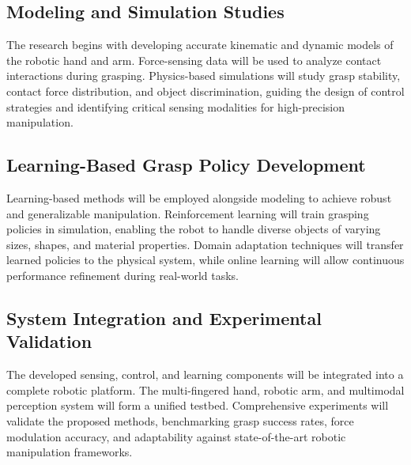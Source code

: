 \documentclass[11pt,a4paper]{article}
\begin{document}
\subsection{Modeling and Simulation Studies}
The research begins with developing accurate kinematic and dynamic models of the robotic hand and arm. Force-sensing data will be used to analyze contact interactions during grasping. Physics-based simulations will study grasp stability, contact force distribution, and object discrimination, guiding the design of control strategies and identifying critical sensing modalities for high-precision manipulation.

\subsection{Learning-Based Grasp Policy Development}
Learning-based methods will be employed alongside modeling to achieve robust and generalizable manipulation. Reinforcement learning will train grasping policies in simulation, enabling the robot to handle diverse objects of varying sizes, shapes, and material properties. Domain adaptation techniques will transfer learned policies to the physical system, while online learning will allow continuous performance refinement during real-world tasks.

\subsection{System Integration and Experimental Validation}
The developed sensing, control, and learning components will be integrated into a complete robotic platform. The multi-fingered hand, robotic arm, and multimodal perception system will form a unified testbed. Comprehensive experiments will validate the proposed methods, benchmarking grasp success rates, force modulation accuracy, and adaptability against state-of-the-art robotic manipulation frameworks.



\end{document}
